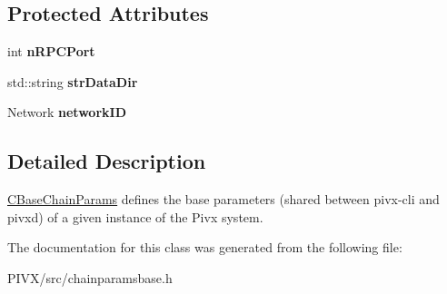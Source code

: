 \subsection*{Protected Attributes}
\begin{DoxyCompactItemize}
\item 
\mbox{\label{class_c_base_chain_params_ae020d8f669175bcac3ab44f9c095c977}} 
int {\bfseries n\+R\+P\+C\+Port}
\item 
\mbox{\label{class_c_base_chain_params_af5868778f8c6c676aabc9fb2366d2447}} 
std\+::string {\bfseries str\+Data\+Dir}
\item 
\mbox{\label{class_c_base_chain_params_af638f3eb624a21ce7ad76ae320f1f650}} 
Network {\bfseries network\+ID}
\end{DoxyCompactItemize}


\subsection{Detailed Description}
\mbox{\hyperlink{class_c_base_chain_params}{C\+Base\+Chain\+Params}} defines the base parameters (shared between pivx-\/cli and pivxd) of a given instance of the Pivx system. 

The documentation for this class was generated from the following file\+:\begin{DoxyCompactItemize}
\item 
P\+I\+V\+X/src/chainparamsbase.\+h\end{DoxyCompactItemize}
